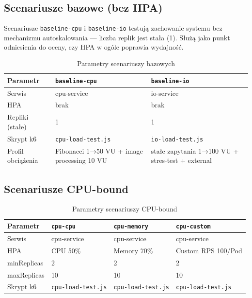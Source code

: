 \subsection{Scenariusze bazowe (bez HPA)}

Scenariusze \texttt{baseline-cpu} i \texttt{baseline-io} testują zachowanie systemu bez mechanizmu autoskalowania — liczba replik jest stała (1). Służą jako punkt odniesienia do oceny, czy HPA w ogóle poprawia wydajność.

\begin{table}[H]
  \centering
  \begin{tabularx}{\textwidth}{|l|X|X|}
    \hline
    \textbf{Parametr} & \texttt{baseline-cpu} & \texttt{baseline-io} \\
    \hline
    Serwis & cpu-service & io-service \\
    HPA & brak & brak \\
    Repliki (stałe) & 1 & 1 \\
    Skrypt k6 & \texttt{cpu-load-test.js} & \texttt{io-load-test.js} \\
    Profil obciążenia & Fibonacci 1→50 VU + image processing 10 VU & stałe zapytania 1→100 VU + stres-test + external \\
    \hline
  \end{tabularx}
  \caption{Parametry scenariuszy bazowych}
  \label{tab:baseline-scenarios}
\end{table}

\subsection{Scenariusze CPU-bound}

\begin{table}[H]
  \centering
  \begin{tabularx}{\textwidth}{|l|X|X|X|}
    \hline
    \textbf{Parametr} & \texttt{cpu-cpu} & \texttt{cpu-memory} & \texttt{cpu-custom} \\
    \hline
    Serwis & cpu-service & cpu-service & cpu-service \\
    HPA & CPU 50\% & Memory 70\% & Custom RPS 100/Pod \\
    minReplicas & 2 & 2 & 2 \\
    maxReplicas & 10 & 10 & 10 \\
    Skrypt k6 & \texttt{cpu-load-test.js} & \texttt{cpu-load-test.js} & \texttt{cpu-load-test.js} \\
    \hline
  \end{tabularx}
  \caption{Parametry scenariuszy CPU-bound}
  \label{tab:cpu-scenarios}
\end{table}

